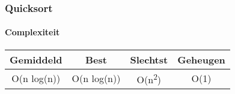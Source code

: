 
\begin{frame}
\frametitle{Quicksort}
\framesubtitle{Complexiteit}
\begin{table}
\begin{tabular}{| c | c | c | c |}
\hline
Gemiddeld & Best & Slechtst & Geheugen\\ 
\hline
O(n log(n)) & O(n log(n)) & O(n\textsuperscript{2}) & O(1)\\
\hline
\end{tabular}
\end{table}
\end{frame}
